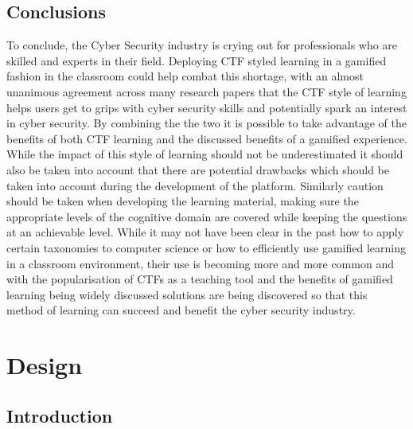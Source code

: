 \documentclass[12pt,a4paper]{article}
\begin{document}
\subsection{Conclusions}
To conclude, the Cyber Security industry is crying out for professionals who are skilled and experts in their field. Deploying CTF styled learning in a gamified fashion in the classroom could help combat this shortage, with an almost unanimous agreement across many research papers that  the CTF style of learning helps users get to grips with cyber security skills and potentially spark an interest in cyber security. By combining the the two it is possible to take advantage of the benefits of both CTF learning and the discussed benefits of a gamified experience. While the impact of this style of learning should not be underestimated it should also be taken into account that there are potential drawbacks which should be taken into account during the development of the platform. Similarly caution should be taken when developing the learning material, making sure the appropriate levels of the cognitive domain are covered while keeping the questions at an achievable level. While it may not have been clear in the past how to apply certain taxonomies to computer science or how to efficiently use gamified learning in a classroom environment, their use is becoming more and more common and with the popularisation of CTFs as a teaching tool and the benefits of gamified learning being widely discussed solutions are being discovered so that this method of learning can succeed and benefit the cyber security industry.

\newpage
\section{Design}
\subsection{Introduction}   
\end{document}
